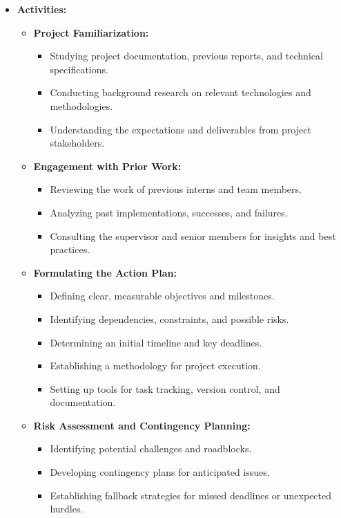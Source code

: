 \documentclass{article}
\begin{document}
\begin{itemize}[leftmargin=*, label={}]
    \item \textbf{Activities:}
    \begin{itemize}
        \item \textbf{Project Familiarization:}
        \begin{itemize}
            \item Studying project documentation, previous reports, and technical specifications.
            \item Conducting background research on relevant technologies and methodologies.
            \item Understanding the expectations and deliverables from project stakeholders.
        \end{itemize}
        \item \textbf{Engagement with Prior Work:}
        \begin{itemize}
            \item Reviewing the work of previous interns and team members.
            \item Analyzing past implementations, successes, and failures.
            \item Consulting the supervisor and senior members for insights and best practices.
        \end{itemize}
        \item \textbf{Formulating the Action Plan:}
        \begin{itemize}
            \item Defining clear, measurable objectives and milestones.
            \item Identifying dependencies, constraints, and possible risks.
            \item Determining an initial timeline and key deadlines.
            \item Establishing a methodology for project execution.
            \item Setting up tools for task tracking, version control, and documentation.
        \end{itemize}
        \item \textbf{Risk Assessment and Contingency Planning:}
        \begin{itemize}
            \item Identifying potential challenges and roadblocks.
            \item Developing contingency plans for anticipated issues.
            \item Establishing fallback strategies for missed deadlines or unexpected hurdles.
        \end{itemize}
    \end{itemize}
    

\end{itemize}
\end{document}
